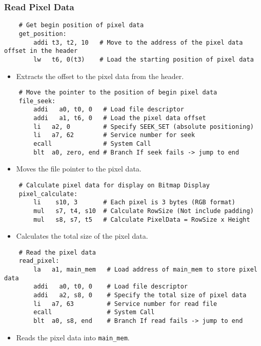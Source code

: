 \documentclass{article}
\begin{document}
\subsubsection{Read Pixel Data}
\begin{verbatim}
    # Get begin position of pixel data
    get_position:
        addi t3, t2, 10   # Move to the address of the pixel data offset in the header
        lw   t6, 0(t3)    # Load the starting position of pixel data
\end{verbatim}
\begin{itemize}
    \item Extracts the offset to the pixel data from the header.
\end{itemize}
\begin{verbatim}
    # Move the pointer to the position of begin pixel data
    file_seek:
        addi   a0, t0, 0   # Load file descriptor	
        addi   a1, t6, 0   # Load the pixel data offset
        li   a2, 0         # Specify SEEK_SET (absolute positioning) 
        li   a7, 62        # Service number for seek
        ecall              # System Call
        blt  a0, zero, end # Branch If seek fails -> jump to end
\end{verbatim}
\begin{itemize}
    \item Moves the file pointer to the pixel data.
\end{itemize}
\begin{verbatim}
    # Calculate pixel data for display on Bitmap Display
    pixel_calculate:
        li    s10, 3       # Each pixel is 3 bytes (RGB format)
        mul   s7, t4, s10  # Calculate RowSize (Not include padding)     
        mul   s8, s7, t5   # Calculate PixelData = RowSize x Height
\end{verbatim}
\begin{itemize}
    \item Calculates the total size of the pixel data.
\end{itemize}
\begin{verbatim}
    # Read the pixel data
    read_pixel:
        la   a1, main_mem   # Load address of main_mem to store pixel data
        addi   a0, t0, 0    # Load file descriptor
        addi   a2, s8, 0    # Specify the total size of pixel data
        li   a7, 63         # Service number for read file
        ecall               # System Call       
        blt  a0, s8, end    # Branch If read fails -> jump to end
\end{verbatim}
\begin{itemize}
    \item Reads the pixel data into \texttt{main_mem}.
\end{itemize}
\end{document}
